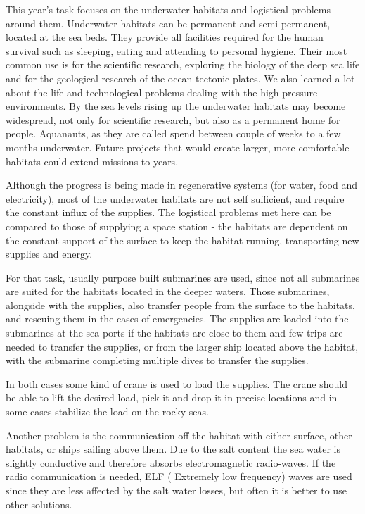 \documentclass[openany]{book}
\begin{document}
	This year's task focuses on the underwater habitats and logistical problems 
	around them.
	Underwater habitats can be permanent and semi-permanent, located at 
	the sea beds.
	They provide all facilities required for the human survival such as 
	sleeping, eating and attending to personal hygiene.
	Their most common use is for the scientific research, exploring the biology 
	of the deep sea life and for the geological research of the ocean tectonic 
	plates.
	We also learned a lot about the life and technological problems dealing 
	with the high pressure environments.
	By the sea levels rising up the underwater habitats may become widespread, 
	not only for scientific research, but also as a permanent home for people.
	Aquanauts, as they are called spend between couple of weeks to a few months 
	underwater.
	Future projects that would create larger, more comfortable habitats could 
	extend missions to years.
	
	Although the progress is being made in regenerative systems (for water, 
	food  and electricity), most of the underwater habitats are not self 
	sufficient, 
	and require the constant influx of the supplies.
	The logistical problems met here can be compared to those of 
	supplying a space station - the habitats are dependent on the constant 
	support of the surface to keep the habitat running, transporting new 
	supplies and energy.
	
	
	For that task, usually purpose built submarines are used,
	since not all submarines are suited for the habitats located in the deeper 
	waters.
	Those submarines, alongside with the supplies, also transfer people from 
	the surface to the habitats, and rescuing them in the 
	cases of emergencies. 
	The supplies are loaded into the submarines at the sea ports if the 
	habitats are close to them and few trips are needed to transfer the 
	supplies, or from the larger ship located above the habitat, with the 
	submarine completing multiple dives to transfer the supplies.
	
	In both cases some kind of crane is used to load the supplies. 
	The crane should be able to lift the desired load, pick it and drop it in 
	precise locations and in some cases stabilize the load on the rocky seas.
	
	Another problem is the communication off the habitat with either surface, 
	other habitats, or ships sailing above them.
	Due to the salt content the sea water is slightly conductive and therefore 
	absorbs electromagnetic radio-waves.
	If the radio communication is needed, ELF ( Extremely low frequency) waves 
	are used since they are less affected by the salt water losses, but often 
	it is better to use other solutions.
	
\end{document}
